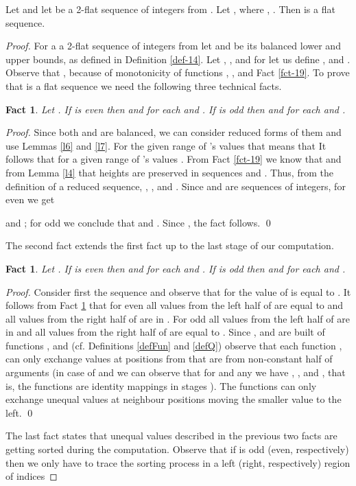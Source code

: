 \documentclass{llncs}
\newtheorem{fact}[theorem]{Fact}
\begin{document}
\begin{theorem}\label{thm-19}
Let  and let  be a 2-flat
sequence of integers from . Let , where ,
. Then  is a flat sequence.
\end{theorem}
\begin{proof}
For a a 2-flat sequence  of integers from  let 
 and  be its balanced lower and upper bounds, as defined 
in Definition \ref{def-14}. Let , ,  and for  let us 
define ,  and . Observe that 
, because of monotonicity of 
functions , ,  and Fact \ref{fct-19}. To prove that 
 is a flat sequence we need the following three 
technical facts.
\begin{fact}\label{fct-21}
Let . If  is even then  and 
for each  and . If  is odd then   and  for each  and . 
\end{fact}
\begin{proof}
Since both  and  are balanced, we can consider reduced 
forms of them and use Lemmas \ref{l6} and \ref{l7}. For the given range of 
's values that means that 
It follows that for a given range of 's values 
. 
From Fact \ref{fct-19} we know that  and from Lemma 
\ref{l4} that heights are preserved in sequences  and 
. Thus, from the definition of a reduced sequence, 
, , 
and . Since 
 and  are sequences of integers, for even  we get 

and ; for odd  we conclude that 
 and . Since , the fact follows.  \qed
\end{proof}
The second fact extends the first fact up to the last stage of our 
computation.
\begin{fact}\label{fct-22}
Let . If  is even then  and 
for each  and . If  is odd
then  and
 for each 
and .
\end{fact}
\begin{proof}
Consider first the sequence  and observe that for  the value of  is equal to . It
follows from Fact \ref{fct-21} that for even  all values from the left half
of  are equal to  and all values from the
right half of  are in .
For odd  all values from the left half of  are in
 and all values from the right half of
 are equal to . Since ,  
and  are built of functions ,  and  (cf. 
Definitions \ref{defFun} and \ref{defQ}) observe that each function ,  can only exchange values at positions from 
 that are from non-constant half of arguments (in case of 
 and  we can observe that for  and any  we have , ,  and 
, that is, the functions are identity mappings in stages ). The  functions can only exchange unequal values 
at neighbour positions moving the smaller value to the left.  \qed
\end{proof}
The last fact states that unequal values  described in the
previous two facts are getting sorted during the computation. Observe that if
 is odd (even, respectively) then we only have to trace the sorting process
in a left (right, respectively) region of indices


\end{proof}
\end{document}
